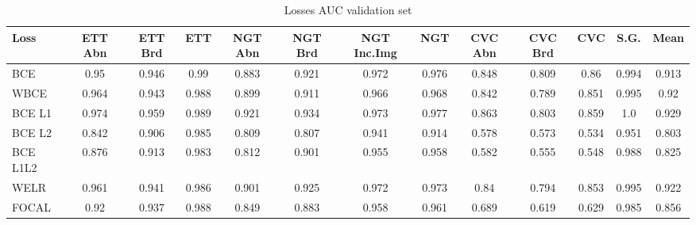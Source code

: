 \documentclass[journal, a4paper]{IEEEtran}
\begin{document}
\begin{table}[ht]
	\bigskip
	\begin{minipage}{\linewidth}
		\centering
		\begin{tabular}{||l c c c c c c c c c c c c||}
			\hline
			Loss     & ETT Abn & ETT Brd & ETT   & NGT Abn & NGT Brd & NGT Inc.Img & NGT   & CVC Abn & CVC Brd & CVC   & S.G.  & Mean  \\ [0.5ex] \hline\hline
			BCE      & 0.95    & 0.946   & 0.99  & 0.883   & 0.921   & 0.972       & 0.976 & 0.848   & 0.809   & 0.86  & 0.994 & 0.913 \\ \hline
			WBCE     & 0.964   & 0.943   & 0.988 & 0.899   & 0.911   & 0.966       & 0.968 & 0.842   & 0.789   & 0.851 & 0.995 & 0.92  \\ \hline
			BCE L1   & 0.974   & 0.959   & 0.989 & 0.921   & 0.934   & 0.973       & 0.977 & 0.863   & 0.803   & 0.859 & 1.0   & 0.929 \\ \hline
			BCE L2   & 0.842   & 0.906   & 0.985 & 0.809   & 0.807   & 0.941       & 0.914 & 0.578   & 0.573   & 0.534 & 0.951 & 0.803 \\ \hline
			BCE L1L2 & 0.876   & 0.913   & 0.983 & 0.812   & 0.901   & 0.955       & 0.958 & 0.582   & 0.555   & 0.548 & 0.988 & 0.825 \\ \hline
			WELR     & 0.961   & 0.941   & 0.986 & 0.901   & 0.925   & 0.972       & 0.973 & 0.84    & 0.794   & 0.853 & 0.995 & 0.922 \\ \hline 
			FOCAL    & 0.92    & 0.937   & 0.988 & 0.849   & 0.883   & 0.958       & 0.961 & 0.689   & 0.619   & 0.629 & 0.985 & 0.856 \\ [0.5ex] \hline
		\end{tabular}
		\label{tab:loss_auc}
		\caption{Losses AUC validation set}
	\end{minipage}
			  

\end{table}
\end{document}
